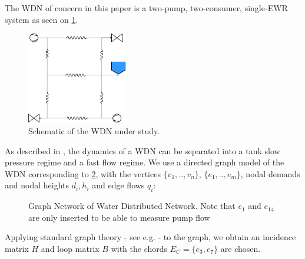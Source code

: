The WDN of concern in this paper is a two-pump, two-consumer, single-EWR system as seen on \cref{fig:WDNModel}.

\begin{figure}[h]
	\centering
	\includegraphics[height = 4cm,width=\linewidth]{Graphics/WDNModel.pdf}
	\caption{Schematic of the WDN under study.}
	\label{fig:WDNModel}
\end{figure}

As described in , the dynamics of a WDN can be separated into a tank slow pressure regime and a fast flow regime. We use a directed graph model of the WDN corresponding to \cref{fig:tikzWDNGraph}, with the vertices $\{v_1,..,v_n\}$,  $\{e_1,..,e_m\}$, nodal demands and nodal heights $d_i, h_i$ and edge flows $q_i$:

\begin{figure}[h!]
	\centering
	\resizebox{\columnwidth}{!}{
		}
	\caption{Graph Network of Water Distributed Network. Note that $e_1$ and $e_{14} $ are only inserted to be able to measure pump flow}
	\label{fig:tikzWDNGraph}
\end{figure}  

Applying standard graph theory - see e.g. \cite{Deo} - to the graph, we obtain an incidence matrix $H$ and loop matrix $B$ with the chords $E_C=\{e_3,e_7\}$ are chosen.

%

